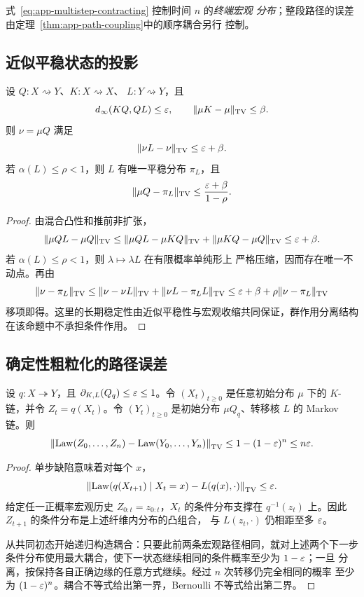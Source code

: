 式~\eqref{eq:app-multistep-contracting} 控制时间 $n$ 的\emph{终端宏观
分布}；整段路径的误差由定理~\ref{thm:app-path-coupling}中的顺序耦合另行
控制。

\subsection{近似平稳状态的投影}

\begin{proposition}[近似平稳状态投影]
\label{prop:stationary-projection}
设 $Q:X\rightsquigarrow Y$、$K:X\rightsquigarrow X$、
$L:Y\rightsquigarrow Y$，且
\[
d_\infty(KQ,QL)\le\varepsilon,
\qquad
\|\mu K-\mu\|_{\operatorname{TV}}\le\beta.
\]
则 $\nu=\mu Q$ 满足
\[
\|\nu L-\nu\|_{\operatorname{TV}}\le\varepsilon+\beta.
\]
若 $\alpha(L)\le\rho<1$，则 $L$ 有唯一平稳分布 $\pi_L$，且
\[
\|\mu Q-\pi_L\|_{\operatorname{TV}}
\le\frac{\varepsilon+\beta}{1-\rho}.
\]
\end{proposition}

\begin{proof}
由混合凸性和推前非扩张，
\[
\|\mu QL-\mu Q\|_{\operatorname{TV}}
\le\|\mu QL-\mu KQ\|_{\operatorname{TV}}
+\|\mu KQ-\mu Q\|_{\operatorname{TV}}
\le\varepsilon+\beta.
\]
若 $\alpha(L)\le\rho<1$，则 $\lambda\mapsto\lambda L$ 在有限概率单纯形上
严格压缩，因而存在唯一不动点。再由
\[
\|\nu-\pi_L\|_{\operatorname{TV}}
\le\|\nu-\nu L\|_{\operatorname{TV}}
+\|\nu L-\pi_LL\|_{\operatorname{TV}}
\le\varepsilon+\beta+\rho\|\nu-\pi_L\|_{\operatorname{TV}}
\]
移项即得。这里的长期稳定性由近似平稳性与宏观收缩共同保证，群作用分离结构
在该命题中不承担条件作用。
\end{proof}

\subsection{确定性粗粒化的路径误差}

\begin{theorem}[宏观路径耦合]
\label{thm:app-path-coupling}
设 $q:X\twoheadrightarrow Y$，且
$\partial_{K,L}(Q_q)\le\varepsilon\le1$。令 $(X_t)_{t\ge0}$ 是任意初始分布
$\mu$ 下的 $K$-链，并令 $Z_t=q(X_t)$。令 $(Y_t)_{t\ge0}$ 是初始分布
$\mu Q_q$、转移核 $L$ 的 Markov 链。则
\begin{equation}
 \left\|
 \operatorname{Law}(Z_0,\ldots,Z_n)
 -\operatorname{Law}(Y_0,\ldots,Y_n)
 \right\|_{\operatorname{TV}}
 \le1-(1-\varepsilon)^n
 \le n\varepsilon.
 \label{eq:app-path-bound}
\end{equation}
\end{theorem}

\begin{proof}
单步缺陷意味着对每个 $x$，
\[
 \left\|
 \operatorname{Law}(q(X_{t+1})\mid X_t=x)
 -L(q(x),\cdot)
 \right\|_{\operatorname{TV}}\le\varepsilon.
\]
给定任一正概率宏观历史 $Z_{0:t}=z_{0:t}$，$X_t$ 的条件分布支撑在
$q^{-1}(z_t)$ 上。因此 $Z_{t+1}$ 的条件分布是上述纤维内分布的凸组合，
与 $L(z_t,\cdot)$ 仍相距至多 $\varepsilon$。

从共同初态开始递归构造耦合：只要此前两条宏观路径相同，就对上述两个下一步
条件分布使用最大耦合，使下一状态继续相同的条件概率至少为 $1-\varepsilon$；一旦
分离，按保持各自正确边缘的任意方式继续。经过 $n$ 次转移仍完全相同的概率
至少为 $(1-\varepsilon)^n$。耦合不等式给出第一界，Bernoulli 不等式给出第二界。
\end{proof}

